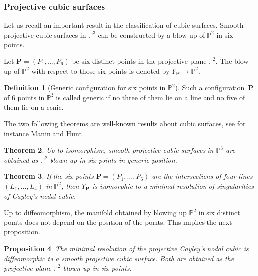 \documentclass[11pt]{article}
\theoremstyle{definition}
\newtheorem{definition}{Definition}[section]
\theoremstyle{plain}
\newtheorem{theorem}[definition]{Theorem}
\newtheorem{proposition}[definition]{Proposition}
\begin{document}
\subsubsection{Projective cubic surfaces}

Let us recall an important result in the classification of cubic surfaces. Smooth projective cubic surfaces in $\mathbb{P}^3$ can be constructed by a blow-up of $\mathbb{P}^2$ in six points.

Let $\boldsymbol{P}=(P_1,\dots,P_6)$ be six distinct points in the projective plane $\mathbb{P}^2$. The blow-up of $\mathbb{P}^2$ with respect to those six points is denoted by $Y_{\boldsymbol{P}}\to \mathbb{P}^2$.

\begin{definition}[Generic configuration for six points in $\mathbb{P}^2$]
Such a configuration~$\boldsymbol{P}$ of $6$ points in $\mathbb{P}^2$ is called generic if no three of them lie on a line and no five of them lie on a conic.
\end{definition}
The two following theorems are well-known results about cubic surfaces, see for instance Manin \cite{Manin1986} and Hunt \cite{Hunt}.
\begin{theorem}\label{th_cubic_six}
Up to isomorphism, smooth projective cubic surfaces in $\mathbb{P}^3$ are obtained as $\mathbb{P}^2$ blown-up in six points in generic position.
\end{theorem}
\begin{theorem}\label{th_cayley_six}
If the six points $\boldsymbol{P}=(P_1,\dots,P_6)$ are the intersections of four lines $(L_1,\dots,L_4)$ in $\mathbb{P}^2$, then $Y_{\boldsymbol{P}}$ is isomorphic to a minimal resolution of singularities of Cayley's nodal cubic.
\end{theorem}

Up to diffeomorphism, the manifold obtained by blowing up $\mathbb{P}^2$ in six distinct points does not depend on the position of the points. This implies the next proposition.

\begin{proposition}
The minimal resolution of the projective Cayley's nodal cubic is diffeomorphic to a smooth projective cubic surface. Both are obtained as the projective plane $\mathbb{P}^2$ blown-up in six points.
\end{proposition}
\end{document}

